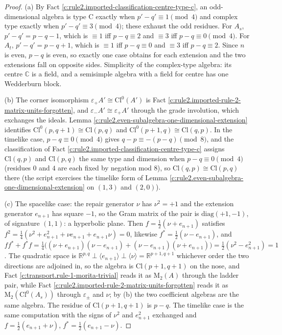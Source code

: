 \documentclass[11pt]{article}
\theoremstyle{definition}
\theoremstyle{plain}
\providecommand{\C}{}\renewcommand{\C}{\mathbb{C}}
\providecommand{\Cl}{}\renewcommand{\Cl}{\mathrm{Cl}}
\providecommand{\Mat}{}\renewcommand{\Mat}{\mathrm{M}}
\providecommand{\R}{}\renewcommand{\R}{\mathbb{R}}
\begin{document}
\begin{proof}
(a) By Fact \ref{c:rule2.imported-classification-centre-type-c}, an odd-dimensional algebra is type C exactly when $p' - q' \equiv 1 \pmod 4$ and complex type exactly when $p' - q' \equiv 3 \pmod 4$; these exhaust the odd residues. For $A_s$, $p' - q' = p - q - 1$, which is $\equiv 1$ iff $p - q \equiv 2$ and $\equiv 3$ iff $p - q \equiv 0 \pmod 4$. For $A_t$, $p' - q' = p - q + 1$, which is $\equiv 1$ iff $p - q \equiv 0$ and $\equiv 3$ iff $p - q \equiv 2$. Since $n$ is even, $p - q$ is even, so exactly one case obtains for each extension and the two extensions fall on opposite sides. Simplicity of the complex-type algebra: its centre $\C$ is a field, and a semisimple algebra with a field for centre has one Wedderburn block.

(b) The corner isomorphism $\varepsilon_+ A' \cong \Cl^0(A')$ is Fact \ref{c:rule2.imported-rule-2-matrix-units-forgotten}, and $\varepsilon_- A' \cong \varepsilon_+ A'$ through the grade involution, which exchanges the ideals. Lemma \ref{c:rule2.even-subalgebra-one-dimensional-extension} identifies $\Cl^0(p,q{+}1) \cong \Cl(p,q)$ and $\Cl^0(p{+}1,q) \cong \Cl(q,p)$. In the timelike case, $p - q \equiv 0 \pmod 4$ gives $q - p \equiv -(p-q) \pmod 8$, and the classification of Fact \ref{c:rule2.imported-classification-centre-type-c} assigns $\Cl(q,p)$ and $\Cl(p,q)$ the same type and dimension when $p - q \equiv 0 \pmod 4$ (residues $0$ and $4$ are each fixed by negation mod 8), so $\Cl(q,p) \cong \Cl(p,q)$ there (the script exercises the timelike form of Lemma \ref{c:rule2.even-subalgebra-one-dimensional-extension} on $(1,3)$ and $(2,0)$).

(c) The spacelike case: the repair generator $\nu$ has $\nu^2 = +1$ and the extension generator $e_{n+1}$ has square $-1$, so the Gram matrix of the pair is $\mathrm{diag}(+1,-1)$, of signature $(1,1)$: a hyperbolic plane. Then $f = \tfrac12(\nu + e_{n+1})$ satisfies $f^2 = \tfrac14(\nu^2 + e_{n+1}^2 + \nu e_{n+1} + e_{n+1}\nu) = 0$, likewise $f^* = \tfrac12(\nu - e_{n+1})$, and $ff^* + f^*f = \tfrac14\bigl((\nu + e_{n+1})(\nu - e_{n+1}) + (\nu - e_{n+1})(\nu + e_{n+1})\bigr) = \tfrac12(\nu^2 - e_{n+1}^2) = 1$. The quadratic space is $\R^{p,q} \perp \langle e_{n+1}\rangle \perp \langle \nu \rangle = \R^{p+1,q+1}$ whichever order the two directions are adjoined in, so the algebra is $\Cl(p{+}1,q{+}1)$ on the nose, and Fact \ref{c:transport.rule-1-morita-trivial} reads it as $\Mat_2(A)$ through the ladder pair, while Fact \ref{c:rule2.imported-rule-2-matrix-units-forgotten} reads it as $\Mat_2(\Cl^0(A_s))$ through $\varepsilon_\pm$ and $\nu$; by (b) the two coefficient algebras are the same algebra. The residue of $\Cl(p{+}1,q{+}1)$ is $p - q$. The timelike case is the same computation with the signs of $\nu^2$ and $e_{n+1}^2$ exchanged and $f = \tfrac12(e_{n+1} + \nu)$, $f^* = \tfrac12(e_{n+1} - \nu)$.


\end{proof}
\end{document}
